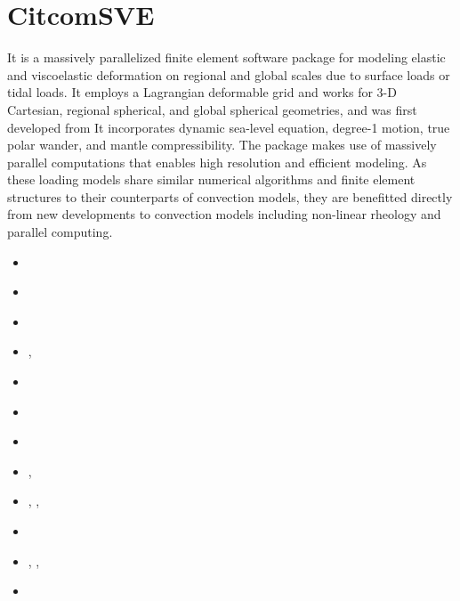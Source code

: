 \section{CitcomSVE} 

It is a massively parallelized finite element software package for modeling elastic 
and viscoelastic deformation on regional and global scales due to 
surface loads or tidal loads. 
It employs a Lagrangian deformable grid and works for 3-D Cartesian, 
regional spherical, and global spherical geometries, and was first developed from \citcoms
It incorporates dynamic sea-level equation, degree-1 motion, true polar wander, 
and mantle compressibility. The package makes use of massively parallel computations 
that enables high resolution and efficient modeling. 
As these loading models share similar numerical algorithms and finite element 
structures to their counterparts of convection models, they are benefitted directly 
from new developments to convection models including non-linear rheology and parallel computing. 

\begin{small}
\begin{itemize}
\item[\twothousandthree]      \textcite{zhpw03}
\item[\twothousandfive]       \textcite{pazw05}
\item[\twothousandtwelve]     \textcite{zhqa12}
\item[\twothousandthirteen]   \textcite{awzh13}, \textcite{zhwa13}
\item[\twothousandfourteen]   \textcite{awzh14}
\item[\twothousandsixteen]    \textcite{qizw16}
\item[\twothousandtwenty]     \textcite{bezw20}
\item[\twothousandtwentyone]  \textcite{bezh21a}, \textcite{bezh21b}
\item[\twothousandtwentytwo]  \textcite{kaza22}, \textcite{bezw22}, \textcite{zhka22}
\item[\twothousandtwentyfour] \textcite{fizm24} 
\item[\twothousandtwentyfive] \textcite{yuzh25}, \textcite{yuzg25}, \textcite{higu25}
\item[\twothousandtwentysix]  \textcite{bekb26}
\end{itemize}
\end{small}



